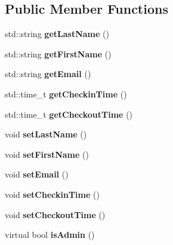 \subsection*{Public Member Functions}
\begin{DoxyCompactItemize}
\item 
\mbox{\label{classUser_a6f51fcdf68a840c62096471863f04dbb}} 
std\+::string {\bfseries get\+Last\+Name} ()
\item 
\mbox{\label{classUser_a676c0a4fd54e525ad300069b5b67812c}} 
std\+::string {\bfseries get\+First\+Name} ()
\item 
\mbox{\label{classUser_a7e15815ed9167b628dec1d751c9708df}} 
std\+::string {\bfseries get\+Email} ()
\item 
\mbox{\label{classUser_ad333878a93fdd060465ee96f9437f097}} 
std\+::time\+\_\+t {\bfseries get\+Checkin\+Time} ()
\item 
\mbox{\label{classUser_a50ab47122f86f67c5a3aa9fdbca9636c}} 
std\+::time\+\_\+t {\bfseries get\+Checkout\+Time} ()
\item 
\mbox{\label{classUser_a9b16e930c2cdcfe6dc690aa6bf101dd8}} 
void {\bfseries set\+Last\+Name} ()
\item 
\mbox{\label{classUser_a639cf8778b55ba194080a380e560adf8}} 
void {\bfseries set\+First\+Name} ()
\item 
\mbox{\label{classUser_ab46f11655a820a6c84a127b203eff850}} 
void {\bfseries set\+Email} ()
\item 
\mbox{\label{classUser_aa4878ea443235a679d08534412944cad}} 
void {\bfseries set\+Checkin\+Time} ()
\item 
\mbox{\label{classUser_aee36df196d282d4dc8b29531c75124e1}} 
void {\bfseries set\+Checkout\+Time} ()
\item 
\mbox{\label{classUser_a2354601eeae130d2f56d7f509325b58e}} 
virtual bool {\bfseries is\+Admin} ()
\end{DoxyCompactItemize}
